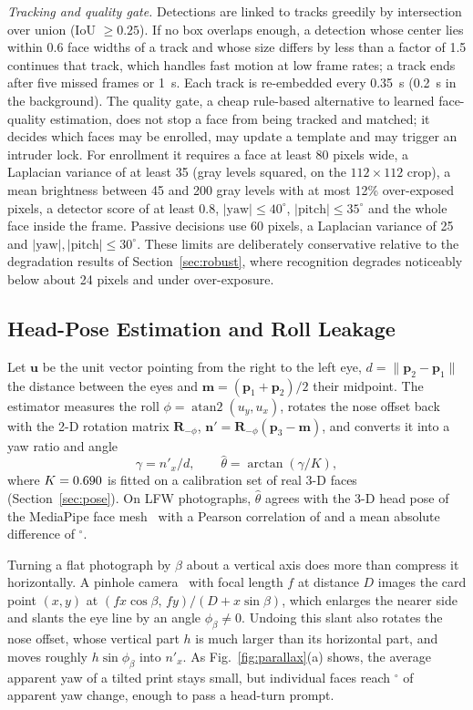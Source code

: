 \documentclass[journal]{IEEEtran}
\begin{document}
\emph{Tracking and quality gate.} Detections are linked to tracks greedily by intersection over union (IoU $\ge0.25$). If no box overlaps enough, a detection whose center lies within 0.6 face widths of a track and whose size differs by less than a factor of 1.5 continues that track, which handles fast motion at low frame rates; a track ends after five missed frames or 1~s. Each track is re-embedded every 0.35~s (0.2~s in the background). The quality gate, a cheap rule-based alternative to learned face-quality estimation, does not stop a face from being tracked and matched; it decides which faces may be enrolled, may update a template and may trigger an intruder lock. For enrollment it requires a face at least 80 pixels wide, a Laplacian variance of at least 35 (gray levels squared, on the $112\times112$ crop), a mean brightness between 45 and 200 gray levels with at most 12\% over-exposed pixels, a detector score of at least 0.8, $|\text{yaw}|\le40^\circ$, $|\text{pitch}|\le35^\circ$ and the whole face inside the frame. Passive decisions use 60 pixels, a Laplacian variance of 25 and $|\text{yaw}|,|\text{pitch}|\le30^\circ$. These limits are deliberately conservative relative to the degradation results of Section~\ref{sec:robust}, where recognition degrades noticeably below about 24 pixels and under over-exposure.

\subsection{Head-Pose Estimation and Roll Leakage}\label{sec:yaw}
Let $\mathbf{u}$ be the unit vector pointing from the right to the left eye, $d=\lVert\mathbf{p}_2-\mathbf{p}_1\rVert$ the distance between the eyes and $\mathbf{m}=(\mathbf{p}_1+\mathbf{p}_2)/2$ their midpoint. The estimator measures the roll $\phi=\operatorname{atan2}(u_y,u_x)$, rotates the nose offset back with the 2-D rotation matrix $\mathbf{R}_{-\phi}$, $\mathbf{n}'=\mathbf{R}_{-\phi}(\mathbf{p}_3-\mathbf{m})$, and converts it into a yaw ratio and angle
\begin{equation}
\gamma = n'_x/d,\qquad \hat{\theta}=\arctan(\gamma/K),
\end{equation}
where $K=0.690$ is fitted on a calibration set of real 3-D faces (Section~\ref{sec:pose}). On \poseN{} LFW photographs, $\hat\theta$ agrees with the 3-D head pose of the MediaPipe face mesh~\cite{kartynnik2019facemesh} with a Pearson correlation of \poseR{} and a mean absolute difference of \poseMae$^\circ$.

Turning a flat photograph by $\beta$ about a vertical axis does more than compress it horizontally. A pinhole camera~\cite{hartley2004mvg} with focal length $f$ at distance $D$ images the card point $(x,y)$ at $(f x\cos\beta,\, f y)/(D+x\sin\beta)$, which enlarges the nearer side and slants the eye line by an angle $\phi_\beta\neq0$. Undoing this slant also rotates the nose offset, whose vertical part $h$ is much larger than its horizontal part, and moves roughly $h\sin\phi_\beta$ into $n'_x$. As Fig.~\ref{fig:parallax}(a) shows, the average apparent yaw of a tilted print stays small, but individual faces reach \parFlatRatioMax$^\circ$ of apparent yaw change, enough to pass a head-turn prompt.
\end{document}
